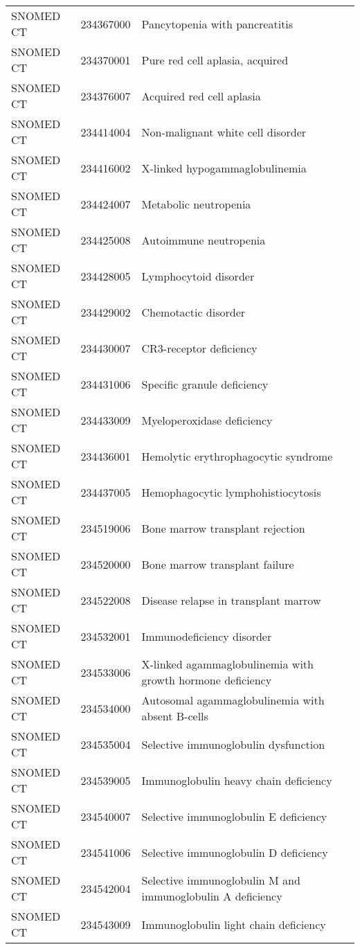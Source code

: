 \begin{longtable}{p{}p{}p{}}
  SNOMED CT & 234367000 & Pancytopenia with pancreatitis \\ 
  SNOMED CT & 234370001 & Pure red cell aplasia, acquired \\ 
  SNOMED CT & 234376007 & Acquired red cell aplasia \\ 
  SNOMED CT & 234414004 & Non-malignant white cell disorder \\ 
  SNOMED CT & 234416002 & X-linked hypogammaglobulinemia \\ 
  SNOMED CT & 234424007 & Metabolic neutropenia \\ 
  SNOMED CT & 234425008 & Autoimmune neutropenia \\ 
  SNOMED CT & 234428005 & Lymphocytoid disorder \\ 
  SNOMED CT & 234429002 & Chemotactic disorder \\ 
  SNOMED CT & 234430007 & CR3-receptor deficiency \\ 
  SNOMED CT & 234431006 & Specific granule deficiency \\ 
  SNOMED CT & 234433009 & Myeloperoxidase deficiency \\ 
  SNOMED CT & 234436001 & Hemolytic erythrophagocytic syndrome \\ 
  SNOMED CT & 234437005 & Hemophagocytic lymphohistiocytosis \\ 
  SNOMED CT & 234519006 & Bone marrow transplant rejection \\ 
  SNOMED CT & 234520000 & Bone marrow transplant failure \\ 
  SNOMED CT & 234522008 & Disease relapse in transplant marrow \\ 
  SNOMED CT & 234532001 & Immunodeficiency disorder \\ 
  SNOMED CT & 234533006 & X-linked agammaglobulinemia with growth hormone deficiency \\ 
  SNOMED CT & 234534000 & Autosomal agammaglobulinemia with absent B-cells \\ 
  SNOMED CT & 234535004 & Selective immunoglobulin dysfunction \\ 
  SNOMED CT & 234539005 & Immunoglobulin heavy chain deficiency \\ 
  SNOMED CT & 234540007 & Selective immunoglobulin E deficiency \\ 
  SNOMED CT & 234541006 & Selective immunoglobulin D deficiency \\ 
  SNOMED CT & 234542004 & Selective immunoglobulin M and immunoglobulin A deficiency \\ 
  SNOMED CT & 234543009 & Immunoglobulin light chain deficiency \\ 

\end{longtable}
